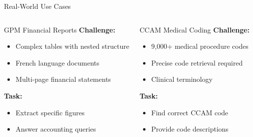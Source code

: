 \documentclass[aspectratio=169]{beamer}
\begin{document}
\begin{frame}{Real-World Use Cases}
\begin{columns}[T]
\begin{block}{GPM Financial Reports}
\textbf{Challenge:}
\begin{itemize}
    \item Complex tables with nested structure
    \item French language documents
    \item Multi-page financial statements
\end{itemize}

\textbf{Task:}
\begin{itemize}
    \item Extract specific figures
    \item Answer accounting queries
\end{itemize}
\end{block}

\begin{block}{CCAM Medical Coding}
\textbf{Challenge:}
\begin{itemize}
    \item 9,000+ medical procedure codes
    \item Precise code retrieval required
    \item Clinical terminology
\end{itemize}

\textbf{Task:}
\begin{itemize}
    \item Find correct CCAM code
    \item Provide code descriptions
\end{itemize}
\end{block}
\end{columns}
\end{frame}
\end{document}
